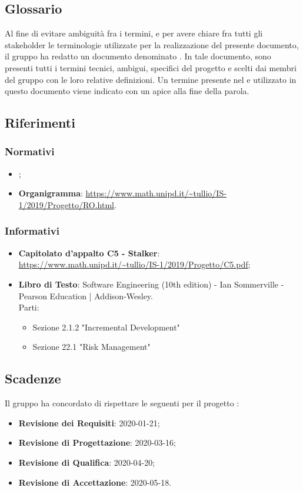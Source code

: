 \subsection{Glossario}
Al fine di evitare ambiguità fra i termini, e per avere chiare fra tutti gli stakeholder le terminologie utilizzate per la realizzazione del presente documento, il gruppo \Gruppo{} ha redatto un documento denominato .
In tale documento, sono presenti tutti i termini tecnici, ambigui, specifici del progetto e scelti dai membri del gruppo con le loro relative definizioni.
Un termine presente nel  e utilizzato in questo documento viene indicato con un apice  alla fine della parola.

\subsection{Riferimenti}
\subsubsection{Normativi}
\begin{itemize}
    \item {};
    \item \textbf{Organigramma}: \url{https://www.math.unipd.it/~tullio/IS-1/2019/Progetto/RO.html}.
\end{itemize}

\subsubsection{Informativi}
\begin{itemize}
    \item \textbf{Capitolato d'appalto C5 - Stalker}: \url{https://www.math.unipd.it/~tullio/IS-1/2019/Progetto/C5.pdf};
    \item \textbf{Libro di Testo}: Software Engineering (10th edition) - Ian Sommerville - Pearson Education | Addison-Wesley.\\
    Parti:
    \begin{itemize}
        \item Sezione 2.1.2 "Incremental Development"
        \item Sezione 22.1 "Risk Management"
    \end{itemize}
\end{itemize}

\subsection{Scadenze}
Il gruppo \Gruppo{} ha concordato di rispettare le seguenti  per il progetto \NomeProgetto{}:
\begin{itemize}
    \item \textbf{Revisione dei Requisiti}: 2020-01-21;
    \item \textbf{Revisione di Progettazione}: 2020-03-16;
    \item \textbf{Revisione di Qualifica}: 2020-04-20;
    \item \textbf{Revisione di Accettazione}: 2020-05-18.
\end{itemize}